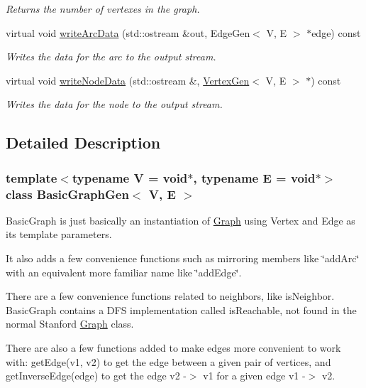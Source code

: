 \begin{DoxyCompactItemize}
\begin{DoxyCompactList}\small\item\em Returns the number of vertexes in the graph. \end{DoxyCompactList}\item 
virtual void \mbox{\hyperlink{classBasicGraphGen_ae7be688f4ddbd7da8eb2a8c7eef8901c}{write\+Arc\+Data}} (std\+::ostream \&out, Edge\+Gen$<$ V, E $>$ $\ast$edge) const
\begin{DoxyCompactList}\small\item\em Writes the data for the arc to the output stream. \end{DoxyCompactList}\item 
virtual void \mbox{\hyperlink{classGraph_ac0db5231476c8cb10655d58ebc108b78}{write\+Node\+Data}} (std\+::ostream \&, \mbox{\hyperlink{classVertexGen}{Vertex\+Gen}}$<$ V, E $>$ $\ast$) const
\begin{DoxyCompactList}\small\item\em Writes the data for the node to the output stream. \end{DoxyCompactList}\end{DoxyCompactItemize}


\subsection{Detailed Description}
\subsubsection*{template$<$typename V = void$\ast$, typename E = void$\ast$$>$\newline
class Basic\+Graph\+Gen$<$ V, E $>$}

Basic\+Graph is just basically an instantiation of \mbox{\hyperlink{classGraph}{Graph}} using Vertex and Edge as its template parameters. 

It also adds a few convenience functions such as mirroring members like \char`\"{}add\+Arc\char`\"{} with an equivalent more familiar name like \char`\"{}add\+Edge\char`\"{}.

There are a few convenience functions related to neighbors, like is\+Neighbor. Basic\+Graph contains a D\+FS implementation called is\+Reachable, not found in the normal Stanford \mbox{\hyperlink{classGraph}{Graph}} class.

There are also a few functions added to make edges more convenient to work with\+: get\+Edge(v1, v2) to get the edge between a given pair of vertices, and get\+Inverse\+Edge(edge) to get the edge v2 -\/$>$ v1 for a given edge v1 -\/$>$ v2. 

